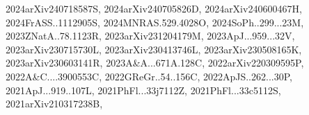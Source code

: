 \documentclass[12pt]{article}
\begin{document}
{2024arXiv240718587S,%
2024arXiv240705826D,%
2024arXiv240600467H,%
2024FrASS..1112905S,%
2024MNRAS.529.4028O,%
2024SoPh..299...23M,%
2023ZNatA..78.1123R,%
2023arXiv231204179M,%
2023ApJ...959...32V,%
2023arXiv230715730L,%
2023arXiv230413746L,%
2023arXiv230508165K,%
2023arXiv230603141R,%
2023A&A...671A.128C,%
2022arXiv220309595P,%
2022A&C....3900553C,%
2022GReGr..54..156C,%
2022ApJS..262...30P,%
2021ApJ...919..107L,%
2021PhFl...33j7112Z,%
2021PhFl...33c5112S,%
2021arXiv210317238B,%
}
\end{document}
